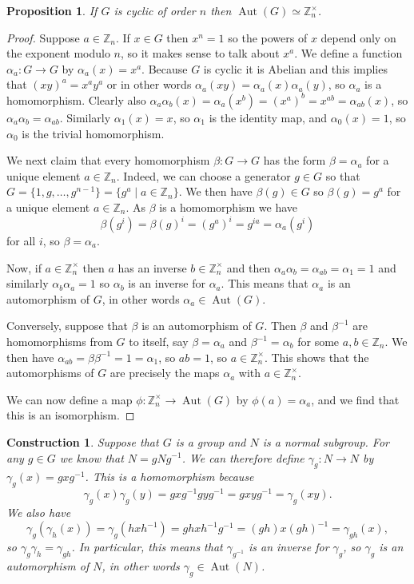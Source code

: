 \documentclass{amsart}
\DeclareMathOperator{\Aut}      {Aut}
\newcommand{\Z}         {{\mathbb{Z}}}
\newcommand{\st}        {\;|\;}
\newcommand{\tm}        {\times}
\newcommand{\xra}       {\xrightarrow}
\newcommand{\al}        {\alpha}
\newcommand{\bt}        {\beta}
\newcommand{\gm}        {\gamma}
\renewcommand{\:}{\colon}
\newtheorem{construction}[theorem]{Construction}
\newtheorem{proposition}[theorem]{Proposition}
\theoremstyle{definition}
\begin{document}
\begin{proposition}
 If $G$ is cyclic of order $n$ then $\Aut(G)\simeq\Z_n^\tm$.
\end{proposition}
\begin{proof}
 Suppose $a\in\Z_n$.  If $x\in G$ then $x^n=1$ so the powers of $x$
 depend only on the exponent modulo $n$, so it makes sense to talk
 about $x^a$.  We define a function $\al_a\:G\xra{}G$ by
 $\al_a(x)=x^a$.  Because $G$ is cyclic it is Abelian and this implies
 that $(xy)^a=x^ay^a$ or in other words $\al_a(xy)=\al_a(x)\al_a(y)$,
 so $\al_a$ is a homomorphism.  Clearly also
 $\al_a\al_b(x)=\al_a(x^b)=(x^a)^b=x^{ab}=\al_{ab}(x)$, so
 $\al_a\al_b=\al_{ab}$.  Similarly $\al_1(x)=x$, so $\al_1$ is the
 identity map, and $\al_0(x)=1$, so $\al_0$ is the trivial
 homomorphism.

 We next claim that every homomorphism $\bt\:G\xra{}G$ has the form
 $\bt=\al_a$ for a unique element $a\in\Z_n$.  Indeed, we can choose a
 generator $g\in G$ so that $G=\{1,g,\ldots,g^{n-1}\}=\{g^a\st
 a\in\Z_n\}$.  We then have $\bt(g)\in G$ so $\bt(g)=g^a$ for a unique
 element $a\in\Z_n$.  As $\bt$ is a homomorphism we have
 \[ \bt(g^i)=\bt(g)^i=(g^a)^i=g^{ia}=\al_a(g^i) \]
 for all $i$, so $\bt=\al_a$.  

 Now, if $a\in\Z_n^\tm$ then $a$ has an inverse $b\in\Z_n^\tm$ and
 then $\al_a\al_b=\al_{ab}=\al_1=1$ and similarly $\al_b\al_a=1$ so
 $\al_b$ is an inverse for $\al_a$.  This means that $\al_a$ is an
 automorphism of $G$, in other words $\al_a\in\Aut(G)$.

 Conversely, suppose that $\bt$ is an automorphism of $G$.  Then $\bt$
 and $\bt^{-1}$ are homomorphisms from $G$ to itself, say $\bt=\al_a$
 and $\bt^{-1}=\al_b$ for some $a,b\in\Z_n$.  We then have
 $\al_{ab}=\bt\bt^{-1}=1=\al_1$, so $ab=1$, so $a\in\Z_n^\tm$.  This
 shows that the automorphisms of $G$ are precisely the maps $\al_a$
 with $a\in\Z_n^\tm$.  

 We can now define a map $\phi\:\Z_n^\tm\xra{}\Aut(G)$ by
 $\phi(a)=\al_a$, and we find that this is an isomorphism.
\end{proof}

\begin{construction}
 Suppose that $G$ is a group and $N$ is a normal subgroup.  For any
 $g\in G$ we know that $N=gNg^{-1}$.  We can therefore define
 $\gm_g\:N\xra{}N$ by $\gm_g(x)=gxg^{-1}$.  This is a homomorphism
 because
 \[ \gm_g(x)\gm_g(y)= gxg^{-1}gyg^{-1}=gxyg^{-1} = \gm_g(xy). \]
 We also have
 \[ \gm_g(\gm_h(x)) = \gm_g(hxh^{-1})=ghxh^{-1}g^{-1} =
      (gh)x(gh)^{-1} = \gm_{gh}(x),
 \]
 so $\gm_g\gm_h=\gm_{gh}$.  In particular, this means that
 $\gm_{g^{-1}}$ is an inverse for $\gm_g$, so $\gm_g$ is an
 automorphism of $N$, in other words $\gm_g\in\Aut(N)$.
\end{construction}
\end{document}
